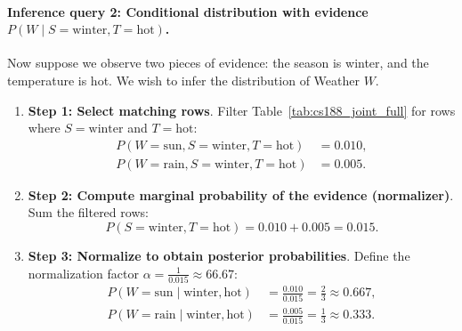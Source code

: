 \paragraph{Inference query 2: Conditional distribution with evidence $P(W \mid S = \text{winter}, T = \text{hot})$.}
Now suppose we observe two pieces of evidence: the season is winter, and the temperature is hot. We wish to infer the distribution of Weather $W$.
\begin{enumerate}
  \item \textbf{Step 1: Select matching rows}. Filter Table~\ref{tab:cs188_joint_full} for rows where $S = \text{winter}$ and $T = \text{hot}$:
  \begin{align}
  P(W = \text{sun}, S = \text{winter}, T = \text{hot}) &= 0.010, \\
  P(W = \text{rain}, S = \text{winter}, T = \text{hot}) &= 0.005.
  \end{align}
  \item \textbf{Step 2: Compute marginal probability of the evidence (normalizer)}. Sum the filtered rows:
  \begin{equation}
  P(S = \text{winter}, T = \text{hot}) = 0.010 + 0.005 = 0.015.
  \end{equation}
  \item \textbf{Step 3: Normalize to obtain posterior probabilities}. Define the normalization factor $\alpha = \frac{1}{0.015} \approx 66.67$:
  \begin{align}
  P(W = \text{sun} \mid \text{winter}, \text{hot}) &= \frac{0.010}{0.015} = \frac{2}{3} \approx 0.667, \\
  P(W = \text{rain} \mid \text{winter}, \text{hot}) &= \frac{0.005}{0.015} = \frac{1}{3} \approx 0.333.
  \end{align}
\end{enumerate}

